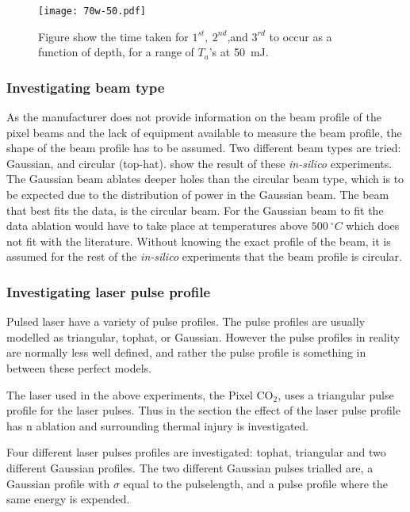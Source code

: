 \begin{figure}[!htb]
	\centering
	\texttt{[image: 70w-50.pdf]}
	\caption{Figure show the time taken for $1^{st},\ 2^{nd}$,and $3^{rd}$ to occur as a function of depth, for a range of $T_a$'s at 50~mJ.}
	\label{fig:time-thres2}
\end{figure}	
\FloatBarrier


\subsubsection*{Investigating beam type}

As the manufacturer does not provide information on the beam profile of the pixel beams and the lack of equipment available to measure the beam profile, the shape of the beam profile has to be assumed. Two different beam types are tried: Gaussian, and circular (top-hat).  show the result of these \textit{in-silico} experiments. The Gaussian beam ablates deeper holes than the circular beam type, which is to be expected due to the distribution of power in the Gaussian beam. The beam that best fits the data, is the circular beam. For the Gaussian beam to fit the data ablation would have to take place at temperatures above $500~^{\circ}C$ which does not fit with the literature. Without knowing the exact profile of the beam, it is assumed for the rest of the \textit{in-silico} experiments that the beam profile is circular.

\subsubsection*{Investigating laser pulse profile}

Pulsed laser have a variety of pulse profiles.
The pulse profiles are usually modelled as triangular, tophat, or Gaussian.
However the pulse profiles in reality are normally less well defined, and rather the pulse profile is something in between these perfect models.

The laser used in the above experiments, the Pixel CO$_2$, uses a triangular pulse profile for the laser pulses.
Thus in the section the effect of the laser pulse profile has n ablation and surrounding thermal injury is investigated.

Four different laser pulses profiles are investigated: tophat, triangular and two different Gaussian profiles.
The two different Gaussian pulses trialled are, a Gaussian profile with $\sigma$ equal to the pulselength, and a pulse profile where the same energy is expended.


